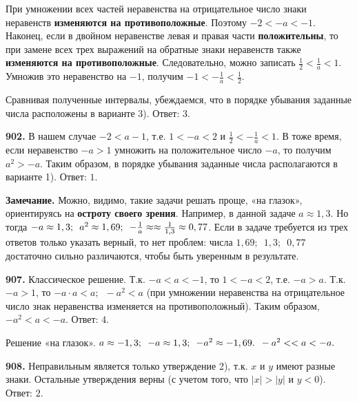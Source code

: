 При умножении всех частей неравенства на отрицательное число знаки неравенств \textbf{изменяются на противоположные}. Поэтому $-2<-a<-1$.     
Наконец, если в двойном неравенстве левая и правая части \textbf{положительны}, то при замене всех трех выражений на обратные знаки неравенств также  \textbf{изменяются на противоположные}. Следовательно, можно записать $\frac{1}{2}<\frac{1}{a}<1$. Умножив это неравенство на $-1$, получим $-1<-\frac{1}{a}<\frac{1}{2}$.

Сравнивая полученные интервалы, убеждаемся, что  в порядке убывания заданные числа расположены в варианте  3). \newline \null \hspace*{\fill} Ответ: $3$. 

\newpage \textbf{902.} В нашем случае $-2<a-1$, т.е. $1<-a<2$ и $\frac{1}{2}<-\frac{1}{a}<1$. В тоже время, если неравенство $-a>1$ умножить на положительное число $-a$, то получим $a^2>-a$. Таким образом, в порядке убывания заданные числа располагаются в варианте 1). \newline \null \hspace*{\fill} Ответ: $1$.

\textbf{Замечание.} Можно, видимо, такие задачи решать проще,  «на глазок», ориентируясь на \textbf{остроту своего зрения}. Например, в данной задаче $a\approx1,3$. Но тогда $-a\approx1,3;\enspace a^2\approx 1,69;\enspace -\frac{1}{a}\approx\linebreak\approx\frac{1}{1,3}\approx0,77$. Если в задаче требуется из трех ответов только указать верный, то нет проблем:  числа $1,69;\enspace1,3;\enspace0,77$ достаточно сильно различаются, чтобы быть уверенным в результате.

\textbf{907.} Классическое решение. Т.к. $-a<a<-1$, то $1<-a<2$, т.е. $-a>a$. Т.к. $-a>1$, то $-a\cdot a<a;\enspace -a^2<a$ (при умножении неравенства на отрицательное число знак неравенства изменяется на противоположный). Таким образом, $-a^2<a<-a$. \newline \null \hspace*{\fill} Ответ: $4$.

Решение «на глазок». $a\approx-1,3;\enspace -a\approx1,3;\enspace -a^2\approx-1,69.\enspace -a^2<\linebreak<a<-a.$

\textbf{908.} Неправильным является только утверждение 2), т.к. $x$ и $y$ имеют разные знаки. Остальные утверждения верны (с учетом того, что $|x|>|y|$ и $y<0$). \newline \null \hspace*{\fill} Ответ: $2$.

